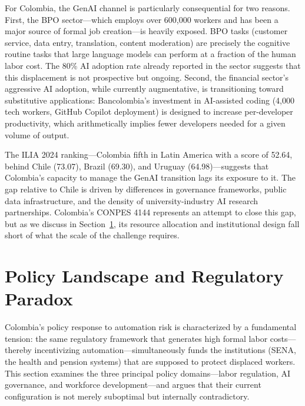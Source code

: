 \documentclass{article}
\begin{document}
For Colombia, the GenAI channel is particularly consequential for two reasons. First, the BPO sector---which employs over 600,000 workers and has been a major source of formal job creation---is heavily exposed. BPO tasks (customer service, data entry, translation, content moderation) are precisely the cognitive routine tasks that large language models can perform at a fraction of the human labor cost. The 80\% AI adoption rate already reported in the sector suggests that this displacement is not prospective but ongoing. Second, the financial sector's aggressive AI adoption, while currently augmentative, is transitioning toward substitutive applications: Bancolombia's investment in AI-assisted coding (4,000 tech workers, GitHub Copilot deployment) is designed to increase per-developer productivity, which arithmetically implies fewer developers needed for a given volume of output.

The ILIA 2024 \cite{ilia2024} ranking---Colombia fifth in Latin America with a score of 52.64, behind Chile (73.07), Brazil (69.30), and Uruguay (64.98)---suggests that Colombia's capacity to manage the GenAI transition lags its exposure to it. The gap relative to Chile is driven by differences in governance frameworks, public data infrastructure, and the density of university-industry AI research partnerships. Colombia's CONPES 4144 \cite{conpes4144} represents an attempt to close this gap, but as we discuss in Section~\ref{sec:policy}, its resource allocation and institutional design fall short of what the scale of the challenge requires.


\FloatBarrier
\section{Policy Landscape and Regulatory Paradox}
\label{sec:policy}

Colombia's policy response to automation risk is characterized by a fundamental tension: the same regulatory framework that generates high formal labor costs---thereby incentivizing automation---simultaneously funds the institutions (SENA, the health and pension systems) that are supposed to protect displaced workers. This section examines the three principal policy domains---labor regulation, AI governance, and workforce development---and argues that their current configuration is not merely suboptimal but internally contradictory.
\end{document}
